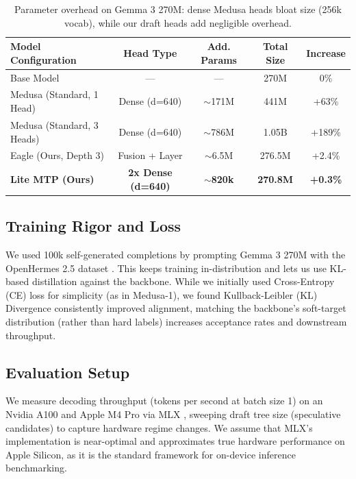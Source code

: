 \documentclass{article} %
\begin{document}
\begin{table}[t]
\caption{Parameter overhead on Gemma 3 270M: dense Medusa heads bloat size (256k vocab), while our draft heads add negligible overhead.}
\label{tab:memory_overhead}
\centering
\begin{tabular}{lcccc}
\toprule
\textbf{Model Configuration} & \textbf{Head Type} & \textbf{Add. Params} & \textbf{Total Size} & \textbf{Increase} \\
\midrule
Base Model & --- & --- & 270M & 0\% \\
Medusa (Standard, 1 Head) & Dense (d=640) & $\sim$171M & 441M & +63\% \\
Medusa (Standard, 3 Heads) & Dense (d=640) & $\sim$786M & 1.05B & +189\% \\
Eagle (Ours, Depth 3) & Fusion + Layer & $\sim$6.5M & 276.5M & +2.4\% \\
\textbf{Lite MTP (Ours)} & \textbf{2x Dense (d=640)} & \textbf{$\sim$820k} & \textbf{270.8M} & \textbf{+0.3\%} \\
\bottomrule
\end{tabular}
\end{table}

\subsection{Training Rigor and Loss}

We used 100k self-generated completions by prompting Gemma 3 270M with the OpenHermes 2.5 dataset \citep{teknium2023openhermes}. This keeps training in-distribution and lets us use KL-based distillation against the backbone. While we initially used Cross-Entropy (CE) loss for simplicity (as in Medusa-1), we found Kullback-Leibler (KL) Divergence consistently improved alignment, matching the backbone's soft-target distribution (rather than hard labels) increases acceptance rates and downstream throughput.

\subsection{Evaluation Setup}

We measure decoding throughput (tokens per second at batch size 1) on an Nvidia A100 and Apple M4 Pro via MLX \citep{hannun2023mlx}, sweeping draft tree size (speculative candidates) to capture hardware regime changes. We assume that MLX's implementation is near-optimal and approximates true hardware performance on Apple Silicon, as it is the standard framework for on-device inference benchmarking.
\end{document}
